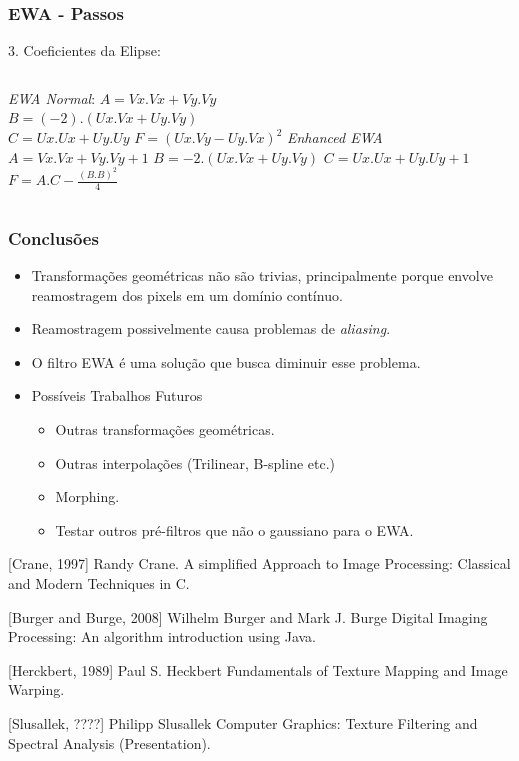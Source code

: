 \documentclass{beamer}
\begin{document}

\begin{frame}[fragile]
\frametitle{EWA - Passos}
3. Coeficientes da Elipse: \\
\begin{columns}[c]
\column{2.0in}
\textit{EWA Normal}:
$A = Vx.Vx + Vy.Vy$ \\
$B = (-2).(Ux.Vx + Uy.Vy)$ \\
$C = Ux.Ux + Uy.Uy$
$F = (Ux.Vy - Uy.Vx)^2$
\column{2.0in}
\textit{Enhanced EWA}
$A = Vx.Vx + Vy.Vy + 1$
$B = -2.(Ux.Vx + Uy.Vy)$
$C = Ux.Ux + Uy.Uy + 1$
$F = A.C - \frac{(B.B)^2}{4}$
\end{columns}
\end{frame}

\begin{frame}
\frametitle{Conclusões}
\begin{itemize}
 \item Transformações geométricas não são trivias, principalmente porque
envolve reamostragem dos pixels em um domínio contínuo.
 \item Reamostragem possivelmente causa problemas de \textit{aliasing}.
 \item O filtro EWA é uma solução que busca diminuir esse problema.
 \item Possíveis Trabalhos Futuros
 \begin{itemize}
  \item Outras transformações geométricas.
  \item Outras interpolações (Trilinear, B-spline etc.)
  \item Morphing.
  \item Testar outros pré-filtros que não o gaussiano para o EWA.
 \end{itemize}
\end{itemize}
\end{frame}

\begin{thebibliography}{10}
[Crane, 1997]
Randy Crane.
\newblock A simplified Approach to Image Processing: Classical and Modern
Techniques in C.

[Burger and Burge, 2008]
Wilhelm Burger and Mark J. Burge
\newblock Digital Imaging Processing: An algorithm introduction using Java.

[Herckbert, 1989]
Paul S. Heckbert
\newblock Fundamentals of Texture Mapping and Image Warping.

[Slusallek, ????]
Philipp Slusallek
\newblock Computer Graphics: Texture Filtering and Spectral Analysis
(Presentation).
\end{thebibliography}
\end{document}
